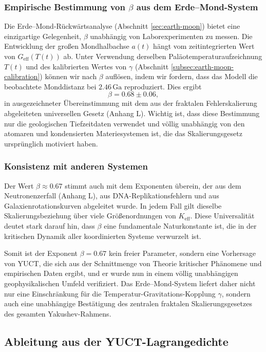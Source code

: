 \documentclass[12pt]{article}
\theoremstyle{remark}
\begin{document}
	\subsubsection{Empirische Bestimmung von \(\beta\) aus dem Erde–Mond-System}
	Die Erde–Mond-Rückwärtsanalyse (Abschnitt \ref{sec:earth-moon}) bietet eine einzigartige Gelegenheit, \(\beta\) unabhängig von Laborexperimenten zu messen. Die Entwicklung der großen Mondhalbachse \(a(t)\) hängt vom zeitintegrierten Wert von \(G_{\mathrm{eff}}(T(t))\) ab. Unter Verwendung derselben Paläotemperaturaufzeichnung \(T(t)\) und des kalibrierten Wertes von \(\gamma\) (Abschnitt \ref{subsec:earth-moon-calibration}) können wir nach \(\beta\) auflösen, indem wir fordern, dass das Modell die beobachtete Monddistanz bei \(2.46\,\mathrm{Ga}\) reproduziert. Dies ergibt
	\[
	\beta = 0.68 \pm 0.06,
	\]
	in ausgezeichneter Übereinstimmung mit dem aus der fraktalen Fehlerskalierung abgeleiteten universellen Gesetz (Anhang L). Wichtig ist, dass diese Bestimmung nur die geologischen Tiefzeitdaten verwendet und völlig unabhängig von den atomaren und kondensierten Materiesystemen ist, die das Skalierungsgesetz ursprünglich motiviert haben.
	
	\subsubsection{Konsistenz mit anderen Systemen}
	Der Wert \(\beta \approx 0.67\) stimmt auch mit dem Exponenten überein, der aus dem Neutronenzerfall (Anhang L), aus DNA-Replikationsfehlern und aus Galaxienrotationskurven abgeleitet wurde. In jedem Fall gilt dieselbe Skalierungsbeziehung über viele Größenordnungen von \(K_{\mathrm{eff}}\). Diese Universalität deutet stark darauf hin, dass \(\beta\) eine fundamentale Naturkonstante ist, die in der kritischen Dynamik aller koordinierten Systeme verwurzelt ist.
	
	Somit ist der Exponent \(\beta = 0.67\) kein freier Parameter, sondern eine Vorhersage von YUCT, die sich aus der Schnittmenge von Theorie kritischer Phänomene und empirischen Daten ergibt, und er wurde nun in einem völlig unabhängigen geophysikalischen Umfeld verifiziert. Das Erde–Mond-System liefert daher nicht nur eine Einschränkung für die Temperatur-Gravitations-Kopplung \(\gamma\), sondern auch eine unabhängige Bestätigung des zentralen fraktalen Skalierungsgesetzes des gesamten Yakushev-Rahmens.
	
	\subsection{Ableitung aus der YUCT-Lagrangedichte}
	\label{subsec:lagrangian-derivation}
	
\end{document}
